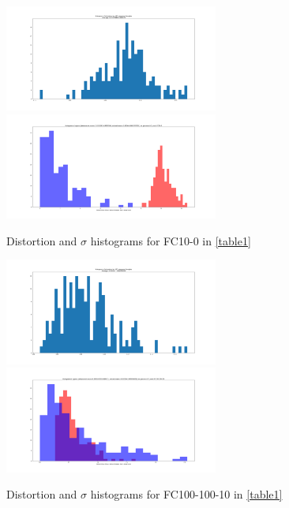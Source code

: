 \documentclass[10pt]{extarticle}
\begin{document}
\begin{figure}[H]
\includegraphics[trim=200 80 100 100, clip,width=7cm]{2019-04-10-adverse/gamma_sigma/FC10-0-distortion_hist.png}\includegraphics[trim=200 80 100 100, clip,width=7cm]{2019-04-10-adverse/gamma_sigma/FC10-0-gamma1_hist.png}
\caption{Distortion and $\sigma$ histograms for FC10-0 in \ref{table1}}
\label{table1hist3}
\end{figure}
\begin{figure}[H]
\includegraphics[trim=200 80 100 100, clip,width=7cm]{2019-04-10-adverse/gamma_sigma/FC100-100-10-distortion_hist.png}\includegraphics[trim=200 80 100 100, clip,width=7cm]{2019-04-10-adverse/gamma_sigma/FC100-100-10-gamma1_hist.png}
\caption{Distortion and $\sigma$ histograms for FC100-100-10 in \ref{table1}}
\label{table1hist4}
\end{figure}
\end{document}
